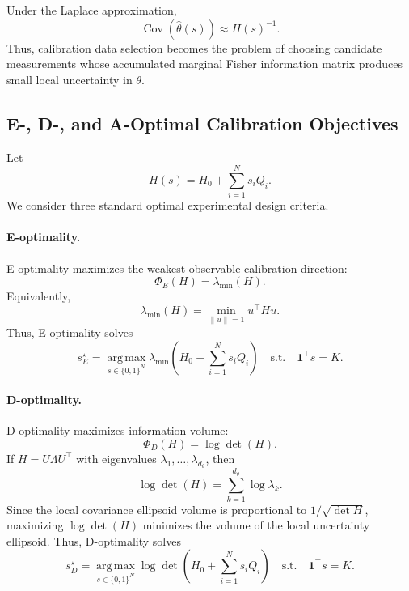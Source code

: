 \documentclass[letterpaper, 9
 pt, conference]{ieeeconf}
\begin{document}
Under the Laplace approximation,
\begin{equation}
    \operatorname{Cov}(\hat{\theta}(s))
    \approx
    H(s)^{-1}.
\end{equation}
Thus, calibration data selection becomes the problem of choosing candidate measurements whose accumulated marginal Fisher information matrix produces small local uncertainty in $\theta$.

\subsection{E-, D-, and A-Optimal Calibration Objectives}
\label{subsec:eda_objectives}

Let
\begin{equation}
    H(s)
    =
    H_0+\sum_{i=1}^{N}s_iQ_i.
\end{equation}
We consider three standard optimal experimental design criteria.

\paragraph{E-optimality.}
E-optimality maximizes the weakest observable calibration direction:
\begin{equation}
    \Phi_E(H)
    =
    \lambda_{\min}(H).
\end{equation}
Equivalently,
\begin{equation}
    \lambda_{\min}(H)
    =
    \min_{\|u\|=1}
    u^\top Hu.
\end{equation}
Thus, E-optimality solves
\begin{equation}
    s_E^\star
    =
    \operatorname*{arg\,max}_{s\in\{0,1\}^{N}}
    \lambda_{\min}
    \left(
    H_0+\sum_{i=1}^{N}s_iQ_i
    \right)
    \quad
    \text{s.t.}
    \quad
    \mathbf{1}^{\top}s=K.
\end{equation}

\paragraph{D-optimality.}
D-optimality maximizes information volume:
\begin{equation}
    \Phi_D(H)
    =
    \log\det(H).
\end{equation}
If $H=U\Lambda U^\top$ with eigenvalues $\lambda_1,\ldots,\lambda_{d_\theta}$, then
\begin{equation}
    \log\det(H)
    =
    \sum_{k=1}^{d_\theta}
    \log \lambda_k.
\end{equation}
Since the local covariance ellipsoid volume is proportional to $1/\sqrt{\det H}$, maximizing $\log\det(H)$ minimizes the volume of the local uncertainty ellipsoid. Thus, D-optimality solves
\begin{equation}
    s_D^\star
    =
    \operatorname*{arg\,max}_{s\in\{0,1\}^{N}}
    \log\det
    \left(
    H_0+\sum_{i=1}^{N}s_iQ_i
    \right)
    \quad
    \text{s.t.}
    \quad
    \mathbf{1}^{\top}s=K.
\end{equation}
\end{document}
